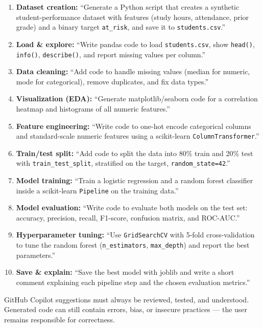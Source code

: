 \documentclass[11pt,a4paper]{article}
\begin{document}
\begin{enumerate}[leftmargin=*,topsep=2pt]
  \item \textbf{Dataset creation:} ``Generate a Python script that creates a synthetic student-performance dataset with features (study hours, attendance, prior grade) and a binary target \texttt{at\_risk}, and save it to \texttt{students.csv}.''
  \item \textbf{Load \& explore:} ``Write pandas code to load \texttt{students.csv}, show \texttt{head()}, \texttt{info()}, \texttt{describe()}, and report missing values per column.''
  \item \textbf{Data cleaning:} ``Add code to handle missing values (median for numeric, mode for categorical), remove duplicates, and fix data types.''
  \item \textbf{Visualization (EDA):} ``Generate matplotlib/seaborn code for a correlation heatmap and histograms of all numeric features.''
  \item \textbf{Feature engineering:} ``Write code to one-hot encode categorical columns and standard-scale numeric features using a scikit-learn \texttt{ColumnTransformer}.''
  \item \textbf{Train/test split:} ``Add code to split the data into 80\% train and 20\% test with \texttt{train\_test\_split}, stratified on the target, \texttt{random\_state=42}.''
  \item \textbf{Model training:} ``Train a logistic regression and a random forest classifier inside a scikit-learn \texttt{Pipeline} on the training data.''
  \item \textbf{Model evaluation:} ``Write code to evaluate both models on the test set: accuracy, precision, recall, F1-score, confusion matrix, and ROC-AUC.''
  \item \textbf{Hyperparameter tuning:} ``Use \texttt{GridSearchCV} with 5-fold cross-validation to tune the random forest (\texttt{n\_estimators}, \texttt{max\_depth}) and report the best parameters.''
  \item \textbf{Save \& explain:} ``Save the best model with joblib and write a short comment explaining each pipeline step and the chosen evaluation metrics.''
\end{enumerate}

\begin{conceptbox}[Reminder]
GitHub Copilot suggestions must always be reviewed, tested, and understood. Generated code can still contain errors, bias, or insecure practices --- the user remains responsible for correctness.
\end{conceptbox}
\end{document}
